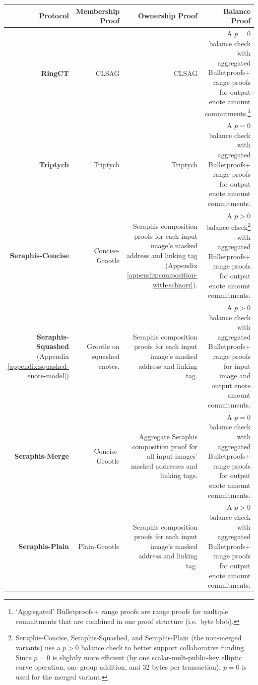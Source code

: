 \begin{tabularx}{\textwidth}{|R|R|R|R|}
\caption{Transaction Protocols Overview}
\label{table:efficiency-transaction-protocols-overview}\\
\hline
    \textbf{Protocol} & Membership Proof & Ownership Proof & Balance Proof \\
\hline\hline
    \textbf{RingCT} \cite{MRL-0005-ringct} & CLSAG \cite{clsag-eprint} & CLSAG & A $p = 0$ balance check with aggregated Bulletproofs+ range proofs \cite{bulletproofs_plus} for output enote amount commitments.\footnote{`Aggregated' Bulletproofs+ range proofs are range proofs for multiple commitments that are combined in one proof structure (i.e.\ byte blob).} \\
\hline
    \textbf{Triptych} \cite{triptych-preprint} & Triptych & Triptych & A $p = 0$ balance check with aggregated Bulletproofs+ range proofs \cite{bulletproofs_plus} for output enote amount commitments. \\
\hline
    \textbf{Seraphis-Concise} & Concise-Grootle & Seraphis composition proofs for each input image's masked address and linking tag (Appendix \ref{appendix:composition-with-schnorr}). & A $p > 0$ balance check\footnote{Seraphis-Concise, Seraphis-Squashed, and Seraphis-Plain (the non-merged variants) use a $p > 0$ balance check to better support collaborative funding. Since $p = 0$ is slightly more efficient (by one scalar-mult-public-key elliptic curve operation, one group addition, and 32 bytes per transaction), $p = 0$ is used for the merged variant.} with aggregated Bulletproofs+ range proofs for output enote amount commitments. \\
\hline
    \textbf{Seraphis-Squashed} (Appendix \ref{appendix:squashed-enote-model}) & Grootle on squashed enotes. & Seraphis composition proofs for each input image's masked address and linking tag. & A $p > 0$ balance check with aggregated Bulletproofs+ range proofs for input image and output enote amount commitments.  \\
\hline
    \textbf{Seraphis-Merge} & Concise-Grootle & Aggregate Seraphis composition proof for all input images' masked addresses and linking tags. & A $p = 0$ balance check with aggregated Bulletproofs+ range proofs for output enote amount commitments. \\
\hline
    \textbf{Seraphis-Plain} & Plain-Grootle & Seraphis composition proofs for each input image's masked address and linking tag. & A $p > 0$ balance check with aggregated Bulletproofs+ range proofs for output enote amount commitments. \\
\hline
\end{tabularx}

